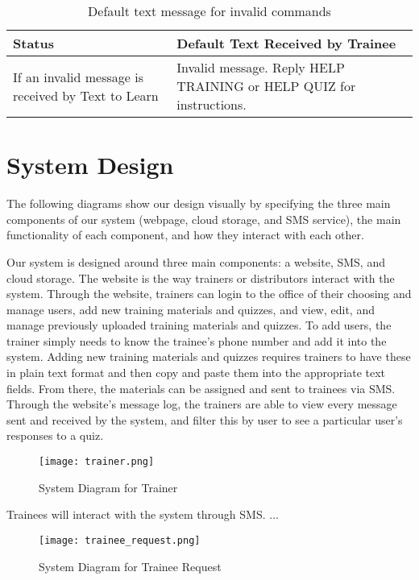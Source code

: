 \begin{table}[H]
	\centering
	\begin{tabular}{ | p{5cm} | p{7cm} |}
		\hline
		\textbf{Status} & \textbf{Default Text Received by Trainee} \\ \hline
		If an invalid message is received by Text to Learn & Invalid message. Reply HELP TRAINING or HELP QUIZ for instructions. \\ \hline
	\end{tabular}
	\caption{Default text message for invalid commands}
\end{table}
	

\section{System Design}
The following diagrams show our design visually by specifying the three main components of our system (webpage, cloud storage, and SMS service), the main functionality of each component, and how they interact with each other.

Our system is designed around three main components: a website, SMS, and cloud storage. The website is the way trainers or distributors interact with the system. Through the website, trainers can login to the office of their choosing and manage users, add new training materials and quizzes, and view, edit, and manage previously uploaded training materials and quizzes. To add users, the trainer simply needs to know the trainee's phone number and add it into the system. Adding new training materials and quizzes requires trainers to have these in plain text format and then copy and paste them into the appropriate text fields. From there, the materials can be assigned and sent to trainees via SMS. Through the website's message log, the trainers are able to view every message sent and received by the system, and filter this by user to see a particular user's responses to a quiz.

\begin{figure}[H]
	\centering
	\texttt{[image: trainer.png]}
	\caption{System Diagram for Trainer}
\end{figure}

Trainees will interact with the system through SMS. ...

\begin{figure}[H]
	\centering
	\texttt{[image: trainee\_request.png]}
	\caption{System Diagram for Trainee Request}
\end{figure}

